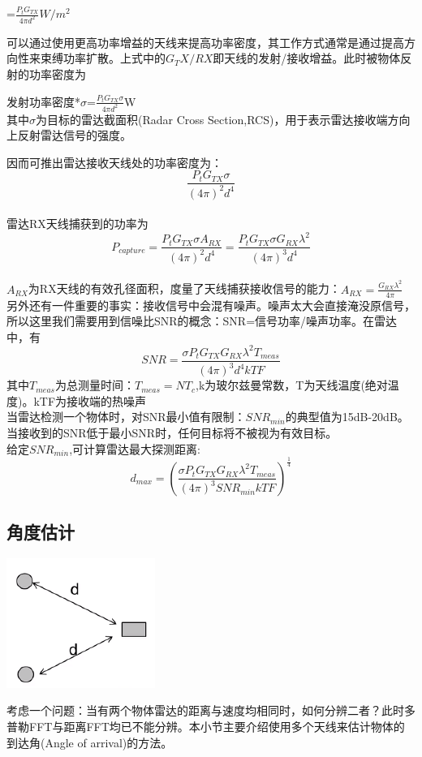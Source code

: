 \documentclass[UTF8]{ctexart}
\begin{document}
{\centering
{}=\(\frac{P_tG_{TX}}{4\pi d^2}\)$W/m^2$\\
}

可以通过使用更高功率增益的天线来提高功率密度，其工作方式通常是通过提高方向性来束缚功率扩散。上式中的$G_TX/RX$即天线的发射/接收增益。此时被物体反射的功率密度为

{\centering
发射功率密度*$\sigma$=\(\frac{P_tG_{TX}\sigma}{4\pi d^2}\)W\\}
其中$\sigma$为目标的雷达截面积(Radar Cross Section,RCS)，用于表示雷达接收端方向上反射雷达信号的强度。

因而可推出雷达接收天线处的功率密度为：
\[\frac{P_tG_{TX}\sigma}{(4\pi)^2 d^4}\]\\
雷达RX天线捕获到的功率为
\[P_{capture}=
\frac{P_tG_{TX}\sigma A_{RX}}{(4\pi)^2 d^4}=
\frac{P_tG_{TX}\sigma G_{RX}\lambda^2}{(4\pi)^3 d^4}
\]\\
$A_{RX}$为RX天线的有效孔径面积，度量了天线捕获接收信号的能力：\(A_{RX}=\frac{G_{RX}\lambda^2}{4\pi}\)\\
另外还有一件重要的事实：接收信号中会混有噪声。噪声太大会直接淹没原信号，所以这里我们需要用到信噪比SNR的概念：SNR=信号功率/噪声功率。在雷达中，有
\[SNR=\frac{\sigma P_tG_{TX}G_{RX}\lambda^2 T_{meas}}{(4\pi)^3 d^4 kTF}\]
其中$T_{meas}$为总测量时间：$T_{meas}=NT_c$,k为玻尔兹曼常数，T为天线温度(绝对温度)。kTF为接收端的热噪声\\
当雷达检测一个物体时，对SNR最小值有限制：$SNR_{min}$的典型值为15dB-20dB。当接收到的SNR低于最小SNR时，任何目标将不被视为有效目标。\\
给定$SNR_{min}$,可计算雷达最大探测距离:
\[d_{max}=(\frac{\sigma P_tG_{TX}G_{RX}\lambda^2 T_{meas}}{(4\pi)^3 SNR_{min} kTF})^{\frac{1}{4}}\]

\subsection{角度估计}
{\centering \includegraphics[width = .3\textwidth]{pic/angleestimate.png}

}
考虑一个问题：当有两个物体雷达的距离与速度均相同时，如何分辨二者？此时多普勒FFT与距离FFT均已不能分辨。本小节主要介绍使用多个天线来估计物体的到达角(Angle of arrival)的方法。
\end{document}
